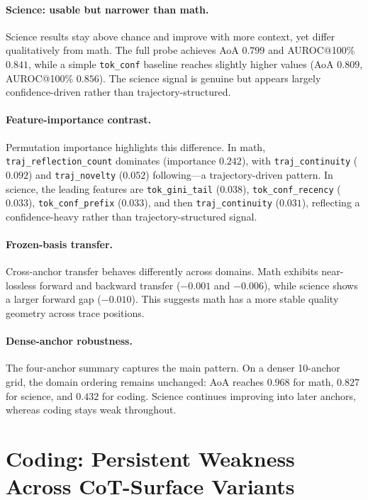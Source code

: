 \documentclass[10pt,twocolumn]{article}
\begin{document}
\paragraph{Science: usable but narrower than math.}
Science results stay above chance and improve with more context, yet differ qualitatively from math. The full probe achieves AoA $0.799$ and AUROC@100\% $0.841$, while a simple \texttt{tok\_conf} baseline reaches slightly higher values (AoA $0.809$, AUROC@100\% $0.856$). The science signal is genuine but appears largely confidence-driven rather than trajectory-structured.

\paragraph{Feature-importance contrast.}
Permutation importance highlights this difference. In math, \texttt{traj\_reflection\_count} dominates (importance $0.242$), with \texttt{traj\_continuity} ($0.092$) and \texttt{traj\_novelty} ($0.052$) following---a trajectory-driven pattern. In science, the leading features are \texttt{tok\_gini\_tail} ($0.038$), \texttt{tok\_conf\_recency} ($0.033$), \texttt{tok\_conf\_prefix} ($0.033$), and then \texttt{traj\_continuity} ($0.031$), reflecting a confidence-heavy rather than trajectory-structured signal.

\paragraph{Frozen-basis transfer.}
Cross-anchor transfer behaves differently across domains. Math exhibits near-lossless forward and backward transfer ($-0.001$ and $-0.006$), while science shows a larger forward gap ($-0.010$). This suggests math has a more stable quality geometry across trace positions.

\paragraph{Dense-anchor robustness.}
The four-anchor summary captures the main pattern. On a denser 10-anchor grid, the domain ordering remains unchanged: AoA reaches $0.968$ for math, $0.827$ for science, and $0.432$ for coding. Science continues improving into later anchors, whereas coding stays weak throughout.

\section{Coding: Persistent Weakness Across CoT-Surface Variants}
\label{sec:coding}
\end{document}
